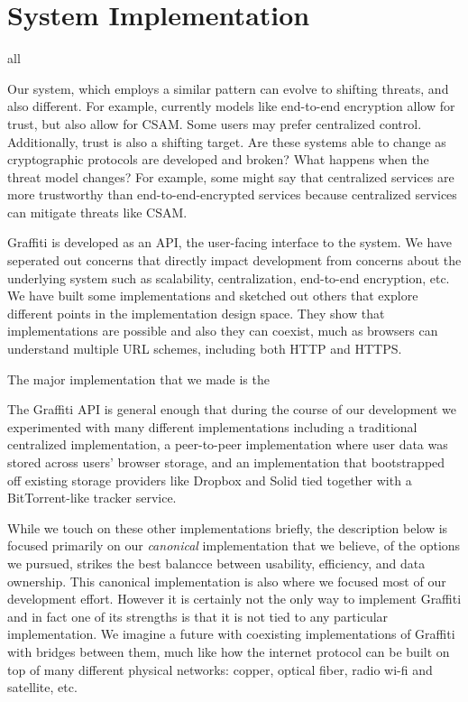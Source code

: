 \section{System Implementation}
all

Our system, which employs a similar pattern can evolve to shifting threats,
and also different. For example, currently models like end-to-end encryption
allow for trust, but also allow for CSAM. Some users may prefer centralized control.
Additionally, trust is also a shifting target.
Are these systems able to change as cryptographic protocols
are developed and broken?
What happens when the threat model changes? For example,
some might say that centralized services are more trustworthy
than end-to-end-encrypted services because centralized services can
mitigate threats like CSAM.

Graffiti is developed as an API, the user-facing interface to the system.
We have seperated out concerns that directly impact development from
concerns about the underlying system such as scalability,
centralization, end-to-end encryption, etc.
We have built some implementations and sketched out others
that explore different points in the implementation design space.
They show that implementations are possible and also they can coexist,
much as browsers can understand multiple URL schemes, including both HTTP and HTTPS.

The major implementation that we made is the


The Graffiti API is general enough that during the course of our development
we experimented with many different implementations including
a traditional centralized implementation, a peer-to-peer implementation where user
data was stored across users' browser storage, and an implementation that
bootstrapped off existing storage providers like Dropbox and Solid
tied together with a BitTorrent-like tracker service.

While we touch on these other implementations briefly,
the description below is focused primarily on our \emph{canonical} implementation
that we believe, of the options we pursued, strikes
the best balancce between usability, efficiency, and data ownership.
This canonical implementation is also where we focused most of our development effort.
However it is certainly not the only way to implement Graffiti and
in fact one of its strengths is that it is not tied to any particular
implementation.
We imagine a future with coexisting implementations
of Graffiti with bridges between them, much like how the internet protocol
can be built on top of many different physical networks:
copper, optical fiber, radio wi-fi and satellite, etc.


